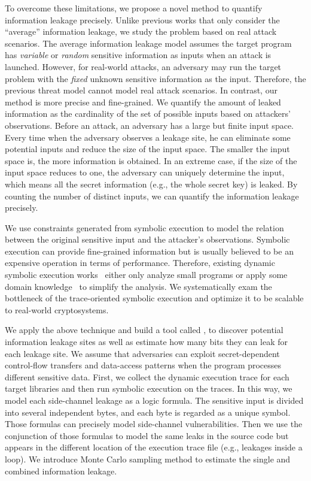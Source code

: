 To overcome these limitations, we propose a novel method to quantify information
leakage precisely. Unlike previous works that only consider the
``average'' information leakage, we study the problem based on real attack
scenarios. The average information leakage model assumes the target program has
\emph{variable} or \emph{random} sensitive information as inputs when an attack is
launched. However, for real-world attacks, an adversary may run the target
problem with the \emph{fixed} unknown sensitive information
as the input. Therefore, the previous threat model cannot model real attack
scenarios. In contrast, our method is more precise and fine-grained. 
We quantify
the amount of leaked information as the cardinality of the set of possible
inputs based on attackers' observations.
Before an attack, an adversary has a large but finite input space. Every time
when the adversary observes a leakage site, he can eliminate some potential
inputs and reduce the size of the input space. The smaller the input space is,
the more information is obtained. In an extreme case, if the size of the
input space reduces to one, the adversary can uniquely determine the input, 
which means all the secret information (e.g., the whole secret key) is
leaked. By counting the number of distinct inputs, we can quantify the
information leakage precisely.

We use constraints generated from symbolic execution to model the relation 
between the original sensitive input
and the attacker's observations. Symbolic execution can
provide fine-grained information but is usually believed to be an expensive
operation in terms of performance. Therefore, existing dynamic symbolic
execution works~\cite{203878,236338,Brotzman19Casym} either only analyze
small programs or apply some domain knowledge~\cite{203878} to simplify the analysis. We
systematically exam the bottleneck of the trace-oriented symbolic execution and optimize it
to be scalable to real-world cryptosystems.

We apply the above technique and build a tool called \tool{},
to discover potential information leakage sites as well as estimate how
many bits they can leak for each leakage site. We assume that adversaries can
exploit secret-dependent control-flow transfers and data-access patterns when
the program processes different sensitive data.
First, we collect the dynamic execution trace for each target
libraries and then run symbolic execution on the traces. In this way, we model
each side-channel leakage as a logic formula. The sensitive input is divided into
several independent bytes, and each byte is regarded as a unique symbol. Those
formulas can precisely model side-channel vulnerabilities. Then we use the conjunction
of those formulas to model the same leaks in the source code but appears in the different location of
the execution trace file (e.g., leakages inside a loop).
We introduce Monte Carlo
sampling method to estimate the single and combined information leakage. 


